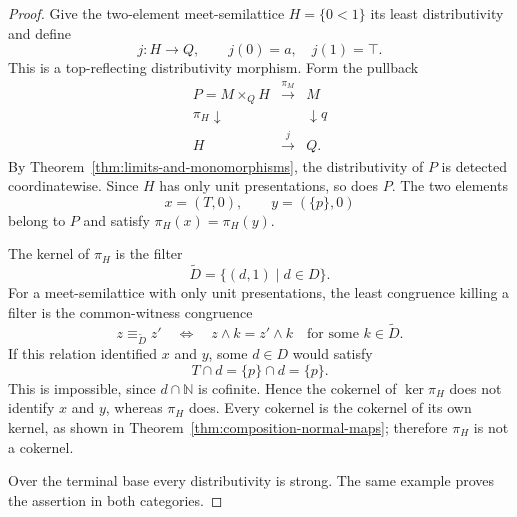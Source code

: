 \documentclass[10pt,a4paper]{amsart}
\begin{document}
\begin{proof}
Give the two-element meet-semilattice \(H=\{0<1\}\) its least
distributivity and define
\[
                   j:H\longrightarrow Q,\qquad
                   j(0)=a,\quad j(1)=\top .
\]
This is a top-reflecting distributivity morphism.  Form the pullback
\[
\begin{array}{ccc}
P=M\times_QH&\xrightarrow{\pi_M}&M\\
{\scriptstyle\pi_H}\downarrow&&\downarrow{\scriptstyle q}\\
H&\xrightarrow{j}&Q .
\end{array}
\]
By Theorem~\ref{thm:limits-and-monomorphisms}, the distributivity of
\(P\) is detected coordinatewise.  Since \(H\) has only unit
presentations, so does \(P\).  The two elements
\[
                         x=(T,0),\qquad y=(\{p\},0)
\]
belong to \(P\) and satisfy \(\pi_H(x)=\pi_H(y)\).

The kernel of \(\pi_H\) is the filter
\[
                   \widetilde D=\{(d,1)\mid d\in D\}.
\]
For a meet-semilattice with only unit presentations, the least
congruence killing a filter is the common-witness congruence
\[
 z\equiv_{\widetilde D}z'
 \quad\Longleftrightarrow\quad
 z\wedge k=z'\wedge k
 \quad\text{for some }k\in\widetilde D .
\]
If this relation identified \(x\) and \(y\), some \(d\in D\) would
satisfy
\[
                         T\cap d=\{p\}\cap d=\{p\}.
\]
This is impossible, since \(d\cap\mathbb N\) is cofinite.  Hence the
cokernel of \(\ker\pi_H\) does not identify \(x\) and \(y\), whereas
\(\pi_H\) does.  Every cokernel is the cokernel of its own kernel, as
shown in Theorem~\ref{thm:composition-normal-maps}; therefore
\(\pi_H\) is not a cokernel.

Over the terminal base every distributivity is strong.  The same
example proves the assertion in both categories.
\end{proof}
\end{document}
